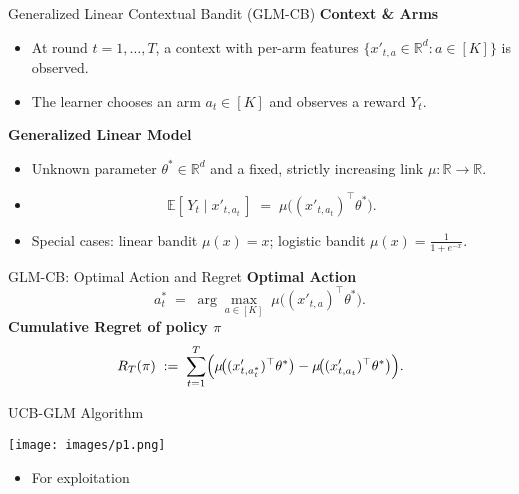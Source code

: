 \documentclass{beamer}
\begin{document}
\begin{frame}{Generalized Linear Contextual Bandit (GLM-CB)}
  \textbf{Context \& Arms}
  \begin{itemize}
    \item At round $t=1,\ldots,T$, a context with per-arm features $\{x'_{t,a} \in \mathbb{R}^d : a \in [K]\}$ is observed.
    \item The learner chooses an arm $a_t \in [K]$ and observes a reward $Y_t$.
  \end{itemize}

  \vspace{0.6em}
  \textbf{Generalized Linear Model}
  \begin{itemize}
    \item Unknown parameter $\theta^\ast \in \mathbb{R}^d$ and a fixed, strictly increasing link $\mu:\mathbb{R}\to\mathbb{R}$.
    \item \[
      \mathbb{E}[\,Y_t \mid x'_{t,a_t}\,] \;=\; \mu\!\bigl((x'_{t,a_t})^\top \theta^\ast\bigr).
      \]
    \item Special cases: linear bandit $\mu(x)=x$; logistic bandit $\mu(x)=\frac{1}{1+e^{-x}}$.
  \end{itemize}
\end{frame}

\begin{frame}{GLM-CB: Optimal Action and Regret}
  \vspace{0.6em}
  \textbf{Optimal Action}
  \[
    a_t^\ast \;=\; \arg\max_{a \in [K]} \; \mu\!\bigl((x'_{t,a})^\top \theta^\ast\bigr).
  \]
  \vspace{0.6em}
  \textbf{Cumulative Regret of policy $\pi$}
  \[
    R_T(\pi) \;:=\; \sum_{t=1}^{T}
      \Bigl(
        \mu\!\bigl((x'_{t,a_t^\ast})^\top \theta^\ast\bigr)
        - \mu\!\bigl((x'_{t,a_t})^\top \theta^\ast\bigr)
      \Bigr).
  \]
\end{frame} 


\begin{frame}{UCB-GLM Algorithm}
  \begin{center}
    \texttt{[image: images/p1.png]}
  \end{center}
  \begin{itemize}
    \item For exploitation
\end{itemize}
\end{frame}
\end{document}
